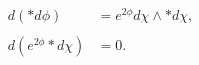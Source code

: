 \begin{equation}
\begin{aligned}
d(\ast d\phi )&=e^{2\phi }d\chi \wedge \ast d\chi ,\\
\\
d(e^{2\phi }\ast d\chi )&=0.
\end{aligned}
\end{equation}

